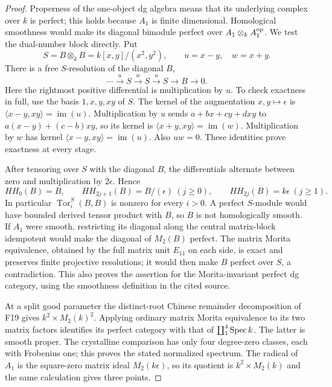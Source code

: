 \documentclass[11pt,a4paper]{article}
\renewcommand{\S}{\ensuremath{\mathsection}}
\newcommand{\fid}[1]{\textsf{#1}}\newcommand{\gate}[1]{\textsf{#1}}
\theoremstyle{named}\newtheorem{finding}{Finding}[section]
\theoremstyle{definition}\newtheorem{definition}[finding]{Definition}
\theoremstyle{remark}\newtheorem{remark}[finding]{Remark}
\begin{document}
\begin{proof}
Properness of the one-object dg algebra means that its underlying
complex over $k$ is perfect; this holds because $A_1$ is finite
dimensional. Homological smoothness would make its diagonal bimodule
perfect over $A_1\otimes_k A_1^{\rm op}$.
We test the dual-number block directly.
Put
\[
 S=B\otimes_k B=k[x,y]/(x^2,y^2),\qquad
 u=x-y,\quad w=x+y.
\]
There is a free $S$-resolution of the diagonal $B$,
\[
 \cdots\xrightarrow{u}S\xrightarrow{w}S
       \xrightarrow{u}S\longrightarrow B\longrightarrow0.
\]
Here the rightmost positive differential is multiplication by $u$.
To check exactness in full, use the basis $1,x,y,xy$ of $S$.
The kernel of the augmentation $x,y\mapsto\epsilon$ is
$\langle x-y,xy\rangle=\operatorname{im}(u)$.
Multiplication by $u$ sends
$a+bx+cy+dxy$ to $a(x-y)+(c-b)xy$, so its kernel is
$\langle x+y,xy\rangle=\operatorname{im}(w)$.
Multiplication by $w$ has kernel
$\langle x-y,xy\rangle=\operatorname{im}(u)$.
Also $uw=0$. These identities prove exactness at every stage.

After tensoring over $S$ with the diagonal $B$, the differentials
alternate between zero and multiplication by $2\epsilon$. Hence
\[
 HH_0(B)=B,\qquad
 HH_{2j+1}(B)=B/(\epsilon)\ (j\ge0),\qquad
 HH_{2j}(B)=k\epsilon\ (j\ge1).
\]
In particular $\operatorname{Tor}^{S}_i(B,B)$ is nonzero for
every $i>0$. A perfect $S$-module would have bounded derived tensor
product with $B$, so $B$ is not homologically smooth.
If $A_1$ were smooth, restricting its diagonal along the central
matrix-block idempotent would make the diagonal of $M_2(B)$
perfect. The matrix Morita equivalence, obtained by the full matrix
unit $E_{11}$ on each side, is exact and preserves finite projective
resolutions; it would then make $B$ perfect over $S$, a contradiction.
This also proves the assertion for the Morita-invariant perfect dg
category, using the smoothness definition in the cited source.

At a split good parameter the distinct-root Chinese remainder
decomposition of \fid{F19} gives $k^2\times M_2(k)^2$.
Applying ordinary matrix Morita equivalence to its two matrix factors
identifies its perfect category with that of $\coprod_1^4\operatorname{Spec} k$.
The latter is smooth proper. The crystalline comparison
\cite[\S7, equations~(7.1)--(7.4), p.~17]{TabuadaWeil}
has only four degree-zero classes, each with Frobenius one; this
proves the stated normalized spectrum. The radical of $A_1$ is
the square-zero matrix ideal $M_2(k\epsilon)$, so its quotient is
$k^2\times M_2(k)$ and the same calculation gives three points.
\end{proof}
\end{document}
